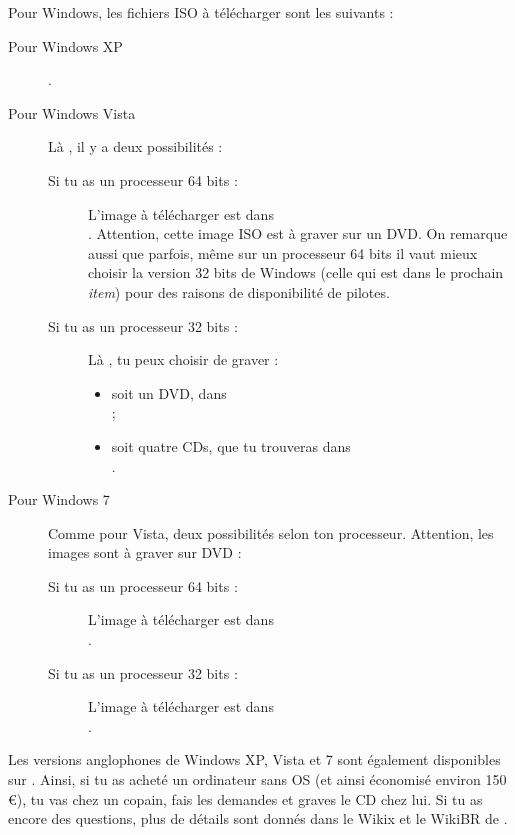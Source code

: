 Pour Windows, les fichiers ISO \`a  t\'el\'echarger sont les suivants :
\begin{description}
\item[Pour Windows XP]
.

\item[Pour Windows Vista]
L\`a , il y a deux possibilit\'es :
\begin{description}
\item[Si tu as un processeur 64 bits :] L'image \`a  t\'el\'echarger est dans\\
. Attention, cette
image ISO est \`a  graver sur un DVD. On remarque aussi que parfois, m\^eme sur un processeur 64 bits il
vaut mieux choisir la version 32 bits de Windows (celle qui est dans le prochain \emph{item}) pour des
raisons de disponibilit\'e de pilotes.
\item[Si tu as un processeur 32 bits :] L\`a , tu peux choisir de graver :
\begin{itemize}
\item soit un DVD, dans \\
;
\item soit quatre CDs, que tu trouveras dans \\
.

\end{itemize}
\end{description}

\item[Pour Windows 7]
Comme pour Vista, deux possibilit\'es selon ton processeur. Attention, les images sont \`a graver sur DVD :
\begin{description}
\item[Si tu as un processeur 64 bits :] L'image \`a  t\'el\'echarger est dans\\
.
\item[Si tu as un processeur 32 bits :] L'image \`a  t\'el\'echarger est dans\\
.

\end{description}
\end{description}

Les versions anglophones de Windows XP, Vista et 7 sont \'egalement disponibles sur .
Ainsi, si tu as achet\'e un ordinateur sans OS (et ainsi \'economis\'e environ 150 \euro), tu vas chez un copain, fais les demandes et graves le CD chez lui. Si tu as encore des questions, plus de d\'etails sont donn\'es dans le Wikix et le WikiBR de \fkz.


